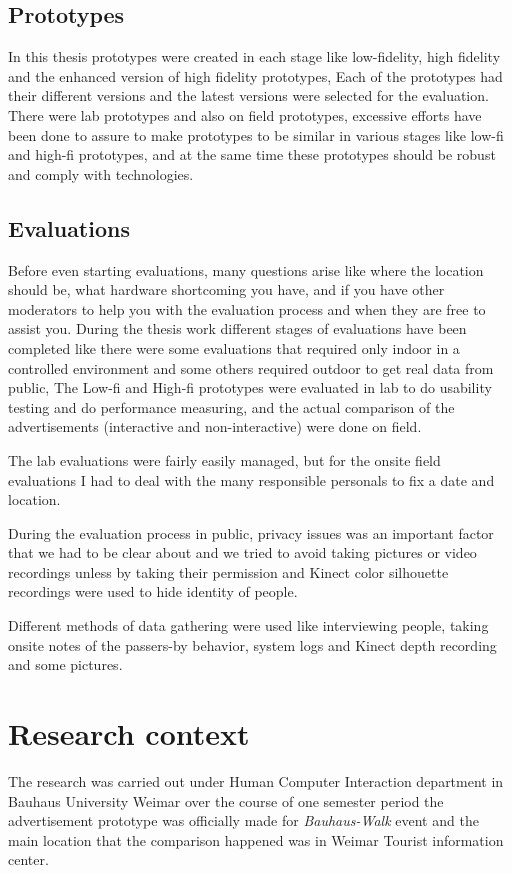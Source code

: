 \subsection{Prototypes}
In this thesis prototypes were created in each stage like low-fidelity, high fidelity and the enhanced version of high fidelity prototypes, Each of the prototypes had their different versions and the latest versions were selected for the evaluation. There were lab prototypes and also on field prototypes, excessive efforts have been done to assure to make prototypes to be similar in various stages like low-fi and high-fi prototypes, and at the same time these prototypes should be robust and comply with technologies.  


\subsection{Evaluations}
Before even starting evaluations, many questions arise like where the location should be, what hardware shortcoming you have, and if you have other moderators to help you with the evaluation process and when they are free to assist you. During the thesis work different stages of evaluations have been completed like there were some evaluations that required only indoor in a controlled environment and some others required outdoor to get real data from public, The Low-fi and High-fi prototypes were evaluated in lab to do usability testing and do performance measuring, and the actual comparison of the advertisements (interactive and non-interactive) were done on field. 

The lab evaluations were fairly easily managed, but for the onsite field evaluations I had to deal with the many responsible personals to fix a date and location.

During the evaluation process in public, privacy issues was an important factor that we had to be clear about and we tried to avoid taking pictures or video recordings unless by taking their permission and Kinect color silhouette recordings were used to hide identity of people.

Different methods of data gathering were used like interviewing people, taking onsite notes of the passers-by behavior, system logs and Kinect depth recording and some pictures. 


\section{Research context}
The research was carried out under Human Computer Interaction department in Bauhaus University Weimar over the course of one semester period the advertisement prototype was officially made for \emph{Bauhaus-Walk} event and the main location that the comparison happened was in Weimar Tourist information center.

